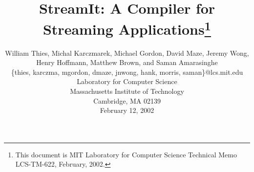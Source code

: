 \documentclass{sig-alternate}
\begin{document}

\title{StreamIt: A Compiler for Streaming Applications\thanks{This document is MIT Laboratory for Computer Science Technical Memo LCS-TM-622, February, 2002.}}


\author{
\alignauthor \vspace{-18pt}
William Thies, 
Michal Karczmarek, 
Michael Gordon, 
David Maze, 
Jeremy Wong,
Henry Hoffmann, 
Matthew Brown, 
and Saman Amarasinghe\\
	\vspace{8pt}
	\{thies, karczma, mgordon, dmaze, jnwong, hank, morris, saman\}@lcs.mit.edu \\
	\vspace{8pt}
	Laboratory for Computer Science \\
	Massachusetts Institute of Technology \\
	Cambridge, MA  02139 \\
	\vspace{8pt}
        February 12, 2002}
	

\newcommand{\ma}[2]{max_{#1 \rightarrow #2}}
\newcommand{\sdep}[0]{\textsc{sdep}}
\newcommand{\loopdep}[0]{\textsc{loopdep}}
\newcommand{\mi}[2]{\sdep_{#2 \small{\rightarrow} #1}}
\newcommand{\floor}[2]{\left\lfloor\frac{#1}{#2}\right\rfloor}
\newcommand{\ceil}[2]{\left\lceil\frac{#1}{#2}\right\rceil}
\newcommand{\ra}[0]{\rightarrow}
\newcommand{\la}[0]{\lambda}

\def\fn#1{\mathop{\mbox{\it #1}}}
\def\fun#1#2{\ensuremath{\mathop{\mbox{\it #1}}(#2)}} %

\newtheorem{definition}{Definition}
\newtheorem{theorem}{Theorem}

\maketitle

\begin{abstract}

\end{abstract}











\end{document}
